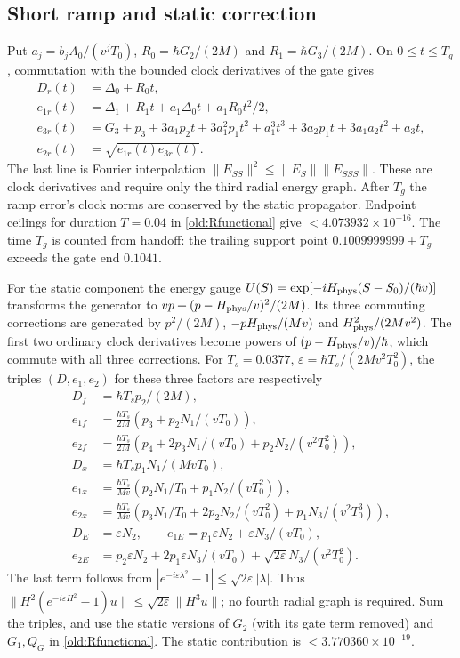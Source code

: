 \documentclass[11pt]{article}
\theoremstyle{definition}\newtheorem{definition}[theorem]{Definition}
\theoremstyle{remark}\newtheorem{remark}[theorem]{Remark}
\begin{document}
\subsection{Short ramp and static correction}
\label{old:rampstatic}
Put $a_j=b_jA_0/(v^jT_0)$, $R_0=\hbar G_2/(2M)$ and
$R_1=\hbar G_3/(2M)$. On $0\leq t\leq T_g$, commutation with the
bounded clock derivatives of the gate gives
\begin{align*}
 D_r(t)&=\Delta_0+R_0t,\\
 e_{1r}(t)&=\Delta_1+R_1t+a_1\Delta_0t+a_1R_0t^2/2,\\
 e_{3r}(t)&=G_3+p_3+3a_1p_2t+3a_1^2p_1t^2+a_1^3t^3
                           +3a_2p_1t+3a_1a_2t^2+a_3t,\\
 e_{2r}(t)&=\sqrt{e_{1r}(t)e_{3r}(t)}.
\end{align*}
The last line is Fourier interpolation
$\|E_{SS}\|^2\leq\|E_S\|\|E_{SSS}\|$.
These are clock derivatives and require only the third radial energy
graph. After $T_g$ the ramp error's clock norms are conserved by the
static propagator. Endpoint ceilings for duration $T=0.04$ in
\eqref{old:Rfunctional} give $<4.073932\times10^{-16}$.
The time $T_g$ is counted from handoff: the trailing support point
$0.1009999999+T_g$ exceeds the gate end $0.1041$.

For the static component the energy gauge
$U(S)=\exp[-iH_{\rm phys}(S-S_0)/(\hbar v)]$ transforms the generator to
$vp+(p-H_{\rm phys}/v)^2/(2M)$.
Its three commuting corrections are generated by
$p^2/(2M)$, $-pH_{\rm phys}/(Mv)$ and $H_{\rm phys}^2/(2Mv^2)$.
The first two ordinary clock derivatives become powers of
$(p-H_{\rm phys}/v)/\hbar$, which commute with all three corrections.
For $T_s=0.0377$, $\varepsilon=\hbar T_s/(2Mv^2T_0^2)$, the triples
$(D,e_1,e_2)$ for these three factors are respectively
\begin{align*}
 D_f&=\hbar T_sp_2/(2M),\\
 e_{1f}&=\frac{\hbar T_s}{2M}(p_3+p_2N_1/(vT_0)),\\
 e_{2f}&=\frac{\hbar T_s}{2M}
          (p_4+2p_3N_1/(vT_0)+p_2N_2/(v^2T_0^2)),\\[2pt]
 D_x&=\hbar T_sp_1N_1/(MvT_0),\\
 e_{1x}&=\frac{\hbar T_s}{Mv}
                    (p_2N_1/T_0+p_1N_2/(vT_0^2)),\\
 e_{2x}&=\frac{\hbar T_s}{Mv}
       (p_3N_1/T_0+2p_2N_2/(vT_0^2)+p_1N_3/(v^2T_0^3)),\\[2pt]
 D_E&=\varepsilon N_2,\qquad
 e_{1E}=p_1\varepsilon N_2+\varepsilon N_3/(vT_0),\\
 e_{2E}&=p_2\varepsilon N_2+2p_1\varepsilon N_3/(vT_0)
                                   +\sqrt{2\varepsilon}N_3/(v^2T_0^2).
\end{align*}
The last term follows from
$|e^{-i\varepsilon\lambda^2}-1|\leq\sqrt{2\varepsilon}|\lambda|$.
Thus $\|H^2(e^{-i\varepsilon H^2}-1)u\|
\leq\sqrt{2\varepsilon}\|H^3u\|$; no fourth radial graph is required.
Sum the triples, and use the static versions of $G_2$
(with its gate term removed) and $G_1,Q_G$ in
\eqref{old:Rfunctional}. The static contribution is
$<3.770360\times10^{-19}$.
\end{document}
